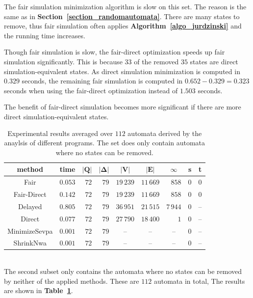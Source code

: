 \documentclass[12pt,oneside,bibliography=totoc,abstracton]{scrartcl}
\newcommand{\emptyccell}{\multicolumn{1}{c}{--}}
\newcommand{\emptyccellrightended}{\multicolumn{1}{c|}{--}}
\newcommand{\tableref}[1]{\textbf{Table~\ref{#1}}}
\newcommand{\sectionref}[1]{\textbf{Section~\ref{#1}}}
\newcommand{\algoref}[1]{\textbf{Algorithm~\ref{#1}}}
\begin{document}
The fair simulation minimization algorithm is slow on this set.
The reason is the same as in \sectionref{section_randomautomata}. There are many states to remove,
thus fair simulation often applies \algoref{algo_jurdzinski} and the running time increases.

Though fair simulation is slow, the fair-direct optimization speeds up fair simulation significantly. This is because $33$ of
the removed $35$ states are direct simulation-equivalent states. As direct simulation minimization is computed in $0.329$ seconds,
the remaining fair simulation is computed in $0.652 - 0.329 = 0.323$ seconds when using the fair-direct optimization
instead of $1.503$ seconds.

The benefit of fair-direct simulation becomes more significant if there are more direct simulation-equivalent states. 
\begin{table}[h]
	 \begin{center}
		\begin{tabular}{|c|lrrrrrrr|}
			\hline
			\multicolumn{1}{|c|}{\cellcolor{black!30}\textbf{method}}
			&\multicolumn{1}{c}{\cellcolor{black!30}\textbf{time}}
			&\multicolumn{1}{c}{\cellcolor{black!30}$\bm{|Q|}$}
			&\multicolumn{1}{c}{\cellcolor{black!30}$\bm{|\Delta|}$}
			&\multicolumn{1}{c}{\cellcolor{black!30}$\bm{|V|}$}
			&\multicolumn{1}{c}{\cellcolor{black!30}$\bm{|E|}$}
			&\multicolumn{1}{c}{\cellcolor{black!30}$\bm{\infty}$}
			&\multicolumn{1}{c}{\cellcolor{black!30}\textbf{s}}
			&\multicolumn{1}{c|}{\cellcolor{black!30}\textbf{t}}\\
			\hline
			Fair			&$0.053$	&$72$	&$79$	&$19\,239$	&$11\,669$	&$858$	&$0$	&$0$\\
			Fair-Direct		&$0.142$	&$72$	&$79$	&$19\,239$	&$11\,669$	&$858$	&$0$	&$0$\\
			Delayed		&$0.805$	&$72$	&$79$	&$36\,951$	&$21\,515$	&$7\,944$	&$0$	&\emptyccellrightended\\
			Direct			&$0.077$	&$72$	&$79$	&$27\,790$	&$18\,400$	&$1$		&$0$	&\emptyccellrightended\\
			MinimizeSevpa	&$0.001$	&$72$	&$79$	&\emptyccell	&\emptyccell	&\emptyccell	&$0$	&\emptyccellrightended\\
			ShrinkNwa		&$0.001$	&$72$	&$79$	&\emptyccell	&\emptyccell	&\emptyccell	&$0$	&\emptyccellrightended\\
			\hline
		\end{tabular}
	\end{center}
	\caption{Experimental results averaged over $112$ automata derived by the anaylsis of different programs.
		The set does only contain automata where no states can be removed.}
	\label{fullautomatanoremove}
\end{table}\quad\\
The second subset only contains the automata where no states can be removed by neither of the
applied methods. These are $112$ automata in total, The results are shown in \tableref{fullautomatanoremove}.
\end{document}
